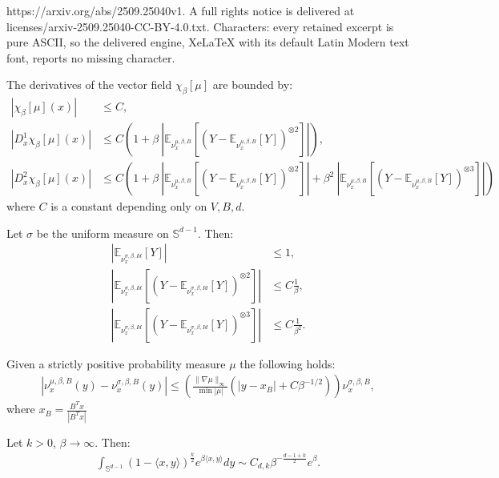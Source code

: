 \documentclass[10pt,a4paper]{amsart}
\begin{document}
https://arxiv.org/abs/2509.25040v1. A full rights notice is delivered at licenses/arxiv-2509.25040-CC-BY-4.0.txt. Characters: every retained excerpt is pure ASCII, so the delivered engine, XeLaTeX with its default Latin Modern text font, reports no missing character.
\begin{lemma}
\label{lem:chi_cumulants}
The derivatives of the vector field $\chi_\beta[\mu]$ are bounded by:
   \begin{align*}
    |\chi_\beta[\mu](x)| & \leq C,\\
    |D^1_x \chi_\beta[\mu](x)| & \leq C\left(1+\beta\ | \mathbb{E}_{\nu_{x}^{\mu,\beta,B}}[\left(Y-\mathbb{E}_{\nu_{x}^{\mu,\beta,B}}[Y]\right)^{\otimes 2}]|\right),\\
    |D^2_x\chi_\beta[\mu](x)| &\leq C\left(1+ \beta\ | \mathbb{E}_{\nu_{x}^{\mu,\beta,B}}[\left(Y-\mathbb{E}_{\nu_{x}^{\mu,\beta,B}}[Y]\right)^{\otimes 2}]|+\beta^2 \ | \mathbb{E}_{\nu_{x}^{\mu,\beta,B}}[\left(Y-\mathbb{E}_{\nu_{x}^{\mu,\beta,B}}[Y]\right)^{\otimes 3}]|\right)
\end{align*}
where $C$ is a constant depending only on $V,B,d$.
\end{lemma}

\begin{lemma}
\label{lem:sigma_cumulants}
    Let $\sigma$ be the uniform measure on $\mathbb{S}^{d-1}$. Then:
    \begin{align*}
        |\mathbb{E}_{\nu_{x}^{\sigma,\beta, Id}}[Y]|&\leq 1,\\
        |\mathbb{E}_{\nu_{x}^{\sigma,\beta,Id}}[\left(Y-\mathbb{E}_{\nu_{x}^{\sigma,\beta,Id}}[Y]\right)^{\otimes 2}]|&\leq C\frac{1}{\beta},\\
        |\mathbb{E}_{\nu_{x}^{\sigma,\beta,Id}}[\left(Y-\mathbb{E}_{\nu_{x}^{\sigma,\beta,Id}}[Y]\right)^{\otimes 3}]|&\leq C\frac{1}{\beta^2}.
    \end{align*}
\end{lemma}

\begin{lemma}
\label{lem:nu_sigma_mu}
Given a strictly positive probability measure $\mu$ the following holds:
\begin{align*}
    |\nu_x^{\mu, \beta,B}(y)-\nu_x^{\sigma, \beta,B}(y)|\leq \left(\frac{\|\nabla \mu\|_{\infty}}{\min |\mu|}(|y-x_B|+C\beta^{-1/2})\right)\nu_x^{\sigma,\beta, B},
\end{align*}
where $x_B=\frac{B^Tx}{|B^Tx|}$
\end{lemma}

\begin{lemma}
\label{lem:integral_estimates}
Let $k>0$, $\beta\to\infty$. Then:
\begin{align*}
\int_{\mathbb{S}^{d-1}} (1-\langle x,y\rangle)^{\frac{k}{2}} e^{\beta \langle x, y \rangle} dy \sim C_{d,k} \beta^{-\frac{d-1+k}{2}}e^{\beta}.
\end{align*}
\end{lemma}
\end{document}
